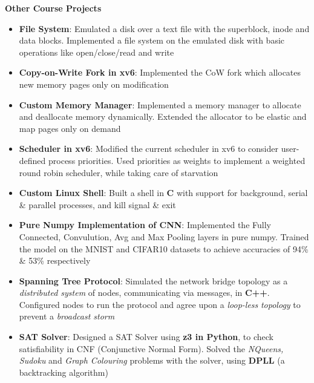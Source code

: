 \documentclass{article}
\begin{document}
\vspace{-5pt}
\textbf{Other Course Projects}\\
\vspace{-18pt}
\begin{itemize}[itemsep = -1.25 mm, leftmargin=*]
\item \textbf{File System}: Emulated a disk over a text file with the superblock, inode and data blocks. Implemented a file system on\vspace{-0.25mm} the emulated disk with basic operations like open/close/read and write
\item \textbf{Copy-on-Write Fork in xv6}: Implemented the CoW fork which allocates new memory pages only on modification %
\item \textbf{Custom Memory Manager}:  Implemented a memory manager to allocate and deallocate memory dynamically. Extended\vspace{-0.25mm} the allocator to be elastic and map pages only on demand
\item \textbf{Scheduler in xv6}: Modified the current scheduler in xv6 to consider user-defined process priorities. Used priorities as\vspace{-0.25mm} weights to implement a weighted round robin scheduler, while taking care of starvation
\item \textbf{Custom Linux Shell}: Built a shell in \textbf{C} with support for background, serial \& parallel processes, and kill signal \& exit
\item \textbf{Pure Numpy Implementation of CNN}: Implemented the Fully Connected, Convulution, Avg and Max Pooling layers\vspace{-0.25mm} in pure numpy. Trained the model on the MNIST and CIFAR10 datasets to achieve accuracies of 94\% \& 53\% respectively
\item \textbf{Spanning Tree Protocol}: Simulated the network bridge topology as a \textit{distributed system} of nodes, communicating via\vspace{-0.25mm} messages, in \textbf{C++}. Configured nodes to run the protocol and agree upon a \textit{loop-less} \textit{topology} to prevent a \textit{broadcast storm}
\item \textbf{SAT Solver}: Designed a SAT Solver using \textbf{z3 in Python}, to check satisfiability in CNF (Conjunctive Normal Form).\vspace{-0.25mm} Solved the \textit{NQueens, Sudoku} and \textit{Graph Colouring} problems with the solver, using \textbf{DPLL} (a backtracking algorithm)

\end{itemize}
\end{document}
